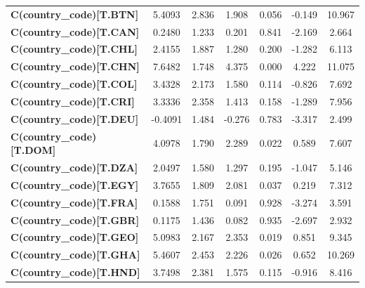 \begin{center}
\begin{tabular}{lcccccc}
\textbf{C(country\_code)[T.BTN]} &       5.4093  &        2.836     &     1.908  &         0.056        &       -0.149    &       10.967     \\
\textbf{C(country\_code)[T.CAN]} &       0.2480  &        1.233     &     0.201  &         0.841        &       -2.169    &        2.664     \\
\textbf{C(country\_code)[T.CHL]} &       2.4155  &        1.887     &     1.280  &         0.200        &       -1.282    &        6.113     \\
\textbf{C(country\_code)[T.CHN]} &       7.6482  &        1.748     &     4.375  &         0.000        &        4.222    &       11.075     \\
\textbf{C(country\_code)[T.COL]} &       3.4328  &        2.173     &     1.580  &         0.114        &       -0.826    &        7.692     \\
\textbf{C(country\_code)[T.CRI]} &       3.3336  &        2.358     &     1.413  &         0.158        &       -1.289    &        7.956     \\
\textbf{C(country\_code)[T.DEU]} &      -0.4091  &        1.484     &    -0.276  &         0.783        &       -3.317    &        2.499     \\
\textbf{C(country\_code)[T.DOM]} &       4.0978  &        1.790     &     2.289  &         0.022        &        0.589    &        7.607     \\
\textbf{C(country\_code)[T.DZA]} &       2.0497  &        1.580     &     1.297  &         0.195        &       -1.047    &        5.146     \\
\textbf{C(country\_code)[T.EGY]} &       3.7655  &        1.809     &     2.081  &         0.037        &        0.219    &        7.312     \\
\textbf{C(country\_code)[T.FRA]} &       0.1588  &        1.751     &     0.091  &         0.928        &       -3.274    &        3.591     \\
\textbf{C(country\_code)[T.GBR]} &       0.1175  &        1.436     &     0.082  &         0.935        &       -2.697    &        2.932     \\
\textbf{C(country\_code)[T.GEO]} &       5.0983  &        2.167     &     2.353  &         0.019        &        0.851    &        9.345     \\
\textbf{C(country\_code)[T.GHA]} &       5.4607  &        2.453     &     2.226  &         0.026        &        0.652    &       10.269     \\
\textbf{C(country\_code)[T.HND]} &       3.7498  &        2.381     &     1.575  &         0.115        &       -0.916    &        8.416     \\

\end{tabular}
\end{center}

